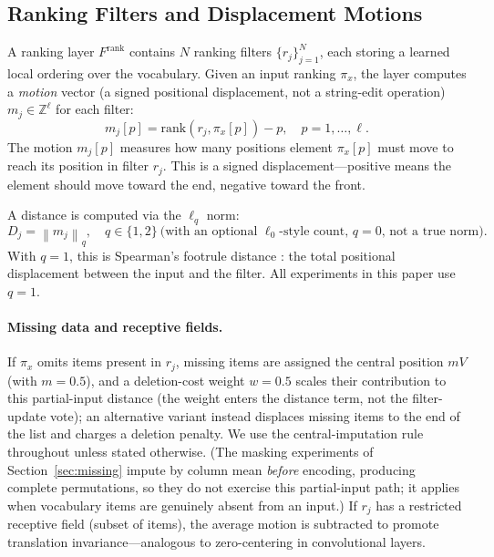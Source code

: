 \documentclass[12pt]{article}
\newcommand{\Z}{\mathbb{Z}}
\newcommand{\norm}[1]{\left\lVert #1 \right\rVert}
\newcommand{\rankop}{\mathrm{rank}}
\begin{document}
\subsection{Ranking Filters and Displacement Motions}
A ranking layer $F^{\mathrm{rank}}$ contains $N$ ranking filters $\{r_j\}_{j=1}^N$, each storing a learned local ordering over the vocabulary. Given an input ranking $\pi_x$, the layer computes a \emph{motion} vector (a signed positional displacement, not a string-edit operation) $m_j \in \Z^\ell$ for each filter:
\begin{equation}
m_j[p] = \rankop(r_j, \pi_x[p]) - p, \quad p = 1, \dots, \ell.
\label{eq:motion}
\end{equation}
The motion $m_j[p]$ measures how many positions element $\pi_x[p]$ must move to reach its position in filter $r_j$. This is a signed displacement---positive means the element should move toward the end, negative toward the front.

A distance is computed via the $\ell_q$ norm:
\begin{equation}
D_j = \norm{m_j}_q, \quad q \in \{1, 2\} \ \text{(with an optional $\ell_0$-style count, $q=0$, not a true norm)}.
\label{eq:distance}
\end{equation}
With $q = 1$, this is Spearman's footrule distance \citep{diaconis1977footrule}: the total positional displacement between the input and the filter. All experiments in this paper use $q=1$.

\paragraph{Missing data and receptive fields.}
If $\pi_x$ omits items present in $r_j$, missing items are assigned the central position $mV$ (with $m=0.5$), and a deletion-cost weight $w=0.5$ scales their contribution to this partial-input distance (the weight enters the distance term, not the filter-update vote); an alternative variant instead displaces missing items to the end of the list and charges a deletion penalty. We use the central-imputation rule throughout unless stated otherwise. (The masking experiments of Section~\ref{sec:missing} impute by column mean \emph{before} encoding, producing complete permutations, so they do not exercise this partial-input path; it applies when vocabulary items are genuinely absent from an input.) If $r_j$ has a restricted receptive field (subset of items), the average motion is subtracted to promote translation invariance---analogous to zero-centering in convolutional layers.
\end{document}
